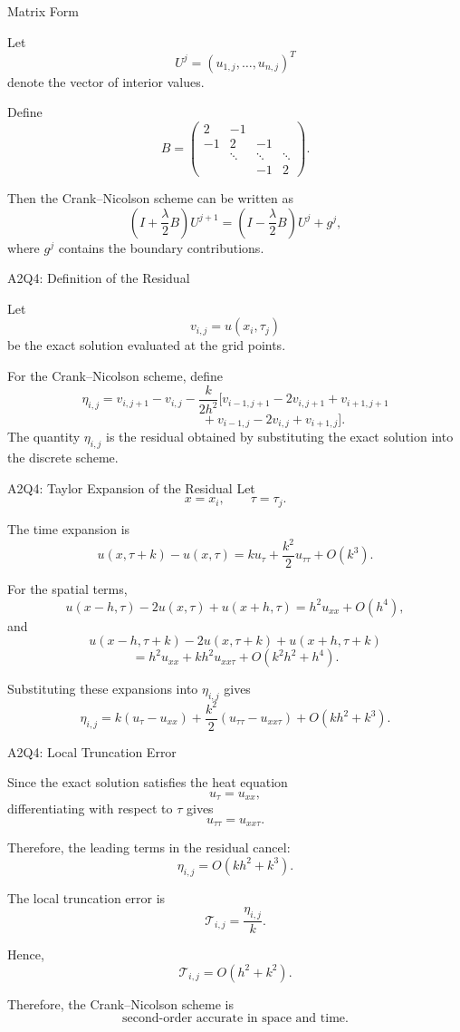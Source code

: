 \documentclass{beamer}
\newcommand{\cT}{\mathcal{T}}
\begin{document}
\begin{frame}{Matrix Form}

Let
\[
U^j=(u_{1,j},\ldots,u_{n,j})^T
\]
denote the vector of interior values.

Define
\[
B=
\begin{pmatrix}
2&-1&&\\
-1&2&-1&\\
&\ddots&\ddots&\ddots\\
&&-1&2
\end{pmatrix}.
\]

Then the Crank--Nicolson scheme can be written as
\[
\left(I+\frac{\lambda}{2}B\right)U^{j+1}
=
\left(I-\frac{\lambda}{2}B\right)U^j
+
g^j,
\]
where \(g^j\) contains the boundary contributions.

\end{frame}


\begin{frame}{A2Q4: Definition of the Residual}

Let
\[
v_{i,j}=u(x_i,\tau_j)
\]
be the exact solution evaluated at the grid points.

For the Crank--Nicolson scheme, define
\[
\eta_{i,j}
=
v_{i,j+1}-v_{i,j}
-\frac{k}{2h^2}
\Big[
v_{i-1,j+1}-2v_{i,j+1}+v_{i+1,j+1}
\]
\[
\qquad\qquad\qquad
+
v_{i-1,j}-2v_{i,j}+v_{i+1,j}
\Big].
\]
The quantity \(\eta_{i,j}\) is the residual obtained by
substituting the exact solution into the discrete scheme.
\end{frame}


\begin{frame}{A2Q4: Taylor Expansion of the Residual}
Let
\[
x=x_i,\qquad \tau=\tau_j.
\]

The time expansion is
\[
u(x,\tau+k)-u(x,\tau)
=
ku_\tau+\frac{k^2}{2}u_{\tau\tau}
+O(k^3).
\]

For the spatial terms,
\[
u(x-h,\tau)-2u(x,\tau)+u(x+h,\tau)
=
h^2u_{xx}+O(h^4),
\]
and
\[
u(x-h,\tau+k)-2u(x,\tau+k)+u(x+h,\tau+k)
\]
\[
=
h^2u_{xx}
+
kh^2u_{xx\tau}
+
O(k^2h^2+h^4).
\]

Substituting these expansions into \(\eta_{i,j}\) gives
\[
\eta_{i,j}
=
k(u_\tau-u_{xx})
+
\frac{k^2}{2}
(u_{\tau\tau}-u_{xx\tau})
+
O(kh^2+k^3).
\]

\end{frame}

\begin{frame}{A2Q4: Local Truncation Error}

Since the exact solution satisfies the heat equation
\[
u_\tau=u_{xx},
\]
differentiating with respect to \(\tau\) gives
\[
u_{\tau\tau}=u_{xx\tau}.
\]

Therefore, the leading terms in the residual cancel:
\[
\eta_{i,j}
=
O(kh^2+k^3).
\]

The local truncation error is
\[
\cT_{i,j}
=
\frac{\eta_{i,j}}{k}.
\]

Hence,
\[
\cT_{i,j}
=
O(h^2+k^2).
\]

Therefore, the Crank--Nicolson scheme is
\[
\boxed{
\text{second-order accurate in space and time}.
}
\]

\end{frame}
\end{document}
